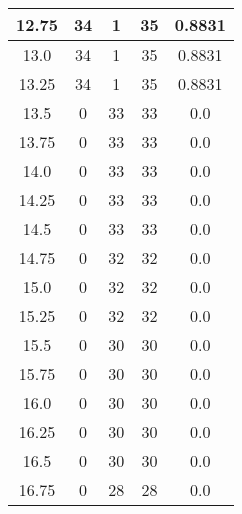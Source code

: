 \documentclass[letterpaper, 12pt]{article}
\begin{document}
\begin{longtable}{|c|c|c|c|c|}
\hline
12.75 & 34 & 1 & 35 & 0.8831 \\
\hline
13.0 & 34 & 1 & 35 & 0.8831 \\
\hline
13.25 & 34 & 1 & 35 & 0.8831 \\
\hline
13.5 & 0 & 33 & 33 & 0.0 \\
\hline
13.75 & 0 & 33 & 33 & 0.0 \\
\hline
14.0 & 0 & 33 & 33 & 0.0 \\
\hline
14.25 & 0 & 33 & 33 & 0.0 \\
\hline
14.5 & 0 & 33 & 33 & 0.0 \\
\hline
14.75 & 0 & 32 & 32 & 0.0 \\
\hline
15.0 & 0 & 32 & 32 & 0.0 \\
\hline
15.25 & 0 & 32 & 32 & 0.0 \\
\hline
15.5 & 0 & 30 & 30 & 0.0 \\
\hline
15.75 & 0 & 30 & 30 & 0.0 \\
\hline
16.0 & 0 & 30 & 30 & 0.0 \\
\hline
16.25 & 0 & 30 & 30 & 0.0 \\
\hline
16.5 & 0 & 30 & 30 & 0.0 \\
\hline
16.75 & 0 & 28 & 28 & 0.0 \\
\hline
\end{longtable}
\end{document}
